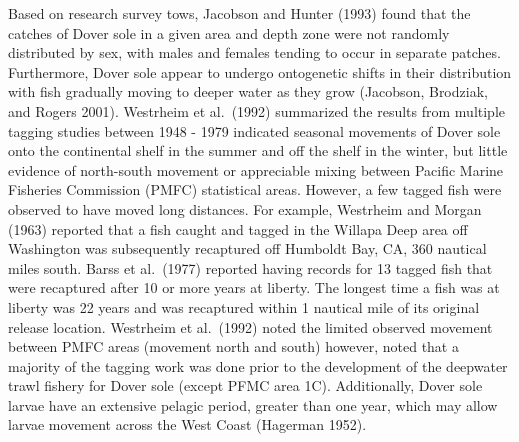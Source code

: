 \documentclass[11pt,
  english,
  a4paper,
]{article}
\begin{document}
\leavevmode\tagmcend\tagstructend\par


Based on research survey tows, Jacobson and Hunter {(1993)\leavevmode\tagmcend\tagstructend} found that the catches of Dover sole in a given area and depth zone were not randomly distributed by sex, with males and females tending to occur in separate patches. Furthermore, Dover sole appear to undergo ontogenetic shifts in their distribution with fish gradually moving to deeper water as they grow {(Jacobson, Brodziak, and Rogers 2001)\leavevmode\tagmcend\tagstructend}. Westrheim et al.~{(1992)\leavevmode\tagmcend\tagstructend} summarized the results from multiple tagging studies between 1948 - 1979 indicated seasonal movements of Dover sole onto the continental shelf in the summer and off the shelf in the winter, but little evidence of north-south movement or appreciable mixing between Pacific Marine Fisheries Commission (PMFC) statistical areas. However, a few tagged fish were observed to have moved long distances. For example, Westrheim and Morgan {(1963)\leavevmode\tagmcend\tagstructend} reported that a fish caught and tagged in the Willapa Deep area off Washington was subsequently recaptured off Humboldt Bay, CA, 360 nautical miles south. Barss et al.~{(1977)\leavevmode\tagmcend\tagstructend} reported having records for 13 tagged fish that were recaptured after 10 or more years at liberty. The longest time a fish was at liberty was 22 years and was recaptured within 1 nautical mile of its original release location. Westrheim et al.~{(1992)\leavevmode\tagmcend\tagstructend} noted the limited observed movement between PMFC areas (movement north and south) however, noted that a majority of the tagging work was done prior to the development of the deepwater trawl fishery for Dover sole (except PFMC area 1C). Additionally, Dover sole larvae have an extensive pelagic period, greater than one year, which may allow larvae movement across the West Coast {(Hagerman 1952)\leavevmode\tagmcend\tagstructend}.

\leavevmode\tagmcend\tagstructend\par
\end{document}
